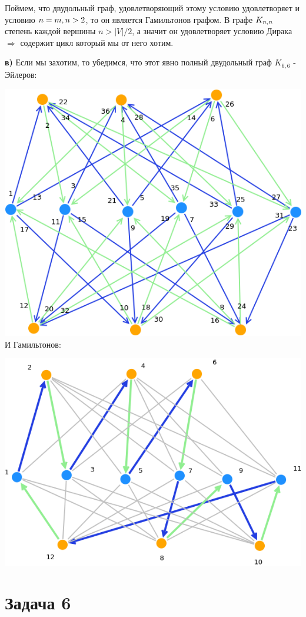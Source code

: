 \documentclass{article}
\begin{document}
 Поймем, что двудольный граф, удовлетворяющий этому условию удовлетворяет и условию $n = m,\space n > 2$, то он является Гамильтонов графом. 
 В графе $K_{n,\space n}$ степень каждой вершины $n > |V| / 2$, а значит он удовлетворяет условию Дирака $\Rightarrow$ содержит цикл который мы от него хотим.

\textbf{в)} Если мы захотим, то убедимся, что этот явно полный двудольный граф $K_{6,6}$ - Эйлеров:

\includegraphics[scale=0.7]{5_1}
\newpage
И Гамильтонов:

\includegraphics[scale=0.7]{5_2}

\section{Задача 6}
\end{document}
